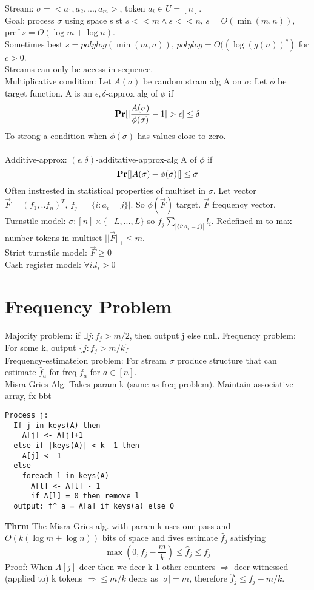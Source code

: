 \documentclass[a4paper]{article}
\def\Pr{\mbox{\textbf{Pr}}}
\begin{document}
Stream: \(\sigma = <a_1,a_2,...,a_m>\), token \(a_i \in U = [n]\).\\
Goal: process \(\sigma\) using space s st \(s<<m \wedge s << n\), \(s=O(\min(m,n))\), pref \(s=O(\log m + \log n)\).\\
Sometimes best \(s=polylog(\min(m,n))\), \(polylog = O((\log(g(n))^c)\) for \(c>0\).\\
Streams can only be access in sequence.\\
Multiplicative condition: Let \(A(\sigma)\) be random stram alg A on \(\sigma\): Let \(\phi\) be target function. A is an \(\epsilon,\delta\)-approx alg of \(\phi\) if
\[\Pr[|\frac{A(\sigma)}{\phi(\sigma)} -1 | > \epsilon] \leq \delta\]
To strong a condition when \(\phi(\sigma)\) has values close to zero.\\\\
Additive-approx:
\((\epsilon,\delta)\)-additative-approx-alg A of \(\phi\) if
\[\Pr[|A(\sigma) - \phi(\sigma)|] \leq \sigma\]
Often instrested in statistical properties of multiset in \(\sigma\). Let vector \(\vec{F} = (f_1,..f_n)^T\), \(f_j = |\{i:a_i = j\}|\). So \(\phi(\vec{F})\) target. \(\vec{F}\) frequency vector.\\
Turnstile model: \(\sigma: [n] \times \{-L,...,L\}\) so \(f_j \sum_{|\{i:a_i=j\}|} l_i\). Redefined m to max number tokens in multiset \(|\!|\vec{F}|\!|_1 \leq m\).\\
Strict turnstile model: \(\vec{F} \geq 0\)\\
Cash register model: \(\forall i.l_i > 0\)
\section{Frequency Problem}
Majority problem: if \(\exists j: f_j > m/2\), then output j else null.
Frequency problem: For some k, output \(\{j:f_j > m/k\}\)\\
Frequency-estimateion problem: For stream \(\sigma\) produce structure that can estimate \(\hat{f}_a\) for freq \(f_a\) for \(a \in [n]\).\\
Misra-Gries Alg: Takes param k (same as freq problem). Maintain associative array, fx bbt
\begin{verbatim}
Process j:
  If j in keys(A) then
    A[j] <- A[j]+1
  else if |keys(A)| < k -1 then
    A[j] <- 1
  else
    foreach l in keys(A)
      A[l] <- A[l] - 1
      if A[l] = 0 then remove l
  output: f^_a = A[a] if keys(a) else 0
\end{verbatim}
\textbf{Thrm} The Misra-Gries alg. with param k uses one pass and \(O(k(\log m+\log n))\) bits of space and fives estimate \(\hat{f}_j\) satisfying
\[\max(0,f_j - \frac{m}{k}) \leq \hat{f}_j \leq f_j\]
Proof:
When \(A[j]\) decr then we decr k-1 other counters \(\Rightarrow\) decr witnessed (applied to) k tokens \(\Rightarrow \leq m/k\) decrs as \(|\sigma| = m\), therefore \(\hat{f}_j \leq f_j -  m/k\).
\end{document}
